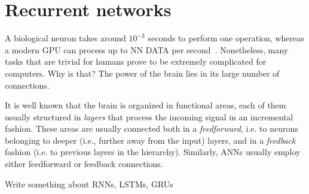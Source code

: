 \section{Recurrent networks}\label{sec:rnn}
A biological neuron takes around $10^{-3}$ seconds to perform one operation,
whereas a modern GPU can process up to NN DATA per second~\citep{NVIDIA}.
Nonetheless, many tasks that are trivial for humans prove to be extremely
complicated for computers. Why is that? The power of the brain lies in its
large number of connections.\cite{SOMETHING}

It is well known that the brain is organized in functional areas, each of them
usually structured in \emph{layers} that process the incoming signal in an
incremental fashion. These areas are usually connected both in a
\emph{feedforward}, i.e. to neurons belonging to deeper (i.e., further away
from the input) layers, and in a \emph{feedback} fashion (i.e. to previous
layers in the hierarchy). Similarly, ANNs usually employ either feedforward or
feedback connections.

Write something about RNNs, LSTMs, GRUs

